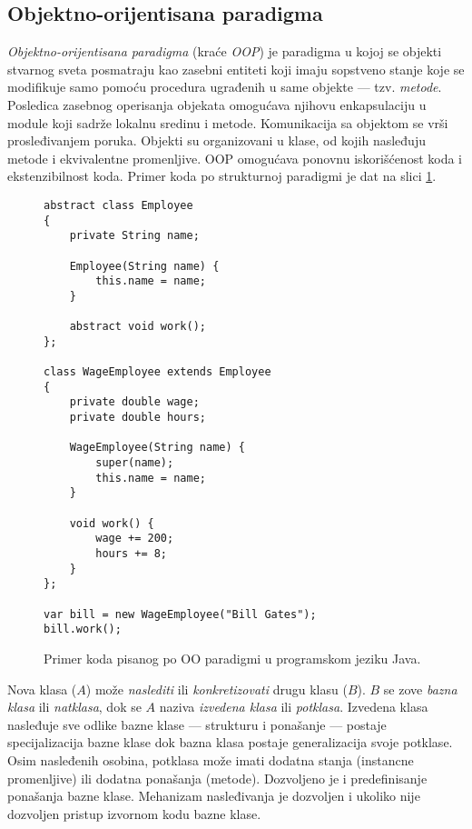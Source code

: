 \subsection{Objektno-orijentisana paradigma}
\label{subsec:ParadigmOOP}

\emph{Objektno-orijentisana paradigma} (kraće \emph{OOP}) je paradigma u kojoj se objekti stvarnog sveta posmatraju kao zasebni entiteti koji imaju sopstveno stanje koje se modifikuje samo pomoću procedura ugrađenih u same objekte --- tzv. \emph{metode}. Posledica zasebnog operisanja objekata omogućava njihovu enkapsulaciju u module koji sadrže lokalnu sredinu i metode. Komunikacija sa objektom se vrši prosleđivanjem poruka. Objekti su organizovani u klase, od kojih nasleđuju metode i ekvivalentne promenljive. OOP omogućava ponovnu iskorišćenost koda i ekstenzibilnost koda. Primer koda po strukturnoj paradigmi je dat na slici \ref{fig:ParadigmOOP}. 

\begin{figure}[h!]
\begin{lstlisting}
abstract class Employee
{
    private String name;

    Employee(String name) {
        this.name = name;
    }

    abstract void work();
};

class WageEmployee extends Employee
{
    private double wage;
    private double hours;

    WageEmployee(String name) {
        super(name);
        this.name = name;
    }

    void work() {
        wage += 200;
        hours += 8;
    }
};

var bill = new WageEmployee("Bill Gates");
bill.work();
\end{lstlisting}
\caption{Primer koda pisanog po OO paradigmi u programskom jeziku Java.}
\label{fig:ParadigmOOP}
\end{figure}

Nova klasa ($A$) može \emph{naslediti} ili \emph{konkretizovati} drugu klasu ($B$). $B$ se zove \emph{bazna klasa} ili \emph{natklasa}, dok se $A$ naziva \emph{izvedena klasa} ili \emph{potklasa}. Izvedena klasa nasleđuje sve odlike bazne klase --- strukturu i ponašanje --- postaje specijalizacija bazne klase dok bazna klasa postaje generalizacija svoje potklase. Osim nasleđenih osobina, potklasa može imati dodatna stanja (instancne promenljive) ili dodatna ponašanja (metode). Dozvoljeno je i predefinisanje ponašanja bazne klase. Mehanizam nasleđivanja je dozvoljen i ukoliko nije dozvoljen pristup izvornom kodu bazne klase.

